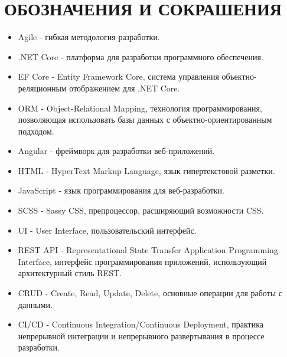 \section*{ОБОЗНАЧЕНИЯ И СОКРАШЕНИЯ}

\begin{itemize}
    \item Agile -\- гибкая методология разработки.
    \item .NET Core -\- платформа для разработки программного обеспечения.
    \item EF Core -\- Entity Framework Core, система управления объектно-реляционным отображением для .NET Core.
    \item ORM -\- Object-Relational Mapping, технология программирования, позволяющая использовать базы данных с объектно-ориентированным подходом.
    \item Angular -\- фреймворк для разработки веб-приложений.
    \item HTML -\- HyperText Markup Language, язык гипертекстовой разметки.
    \item JavaScript -\- язык программирования для веб-разработки.
    \item SCSS -\- Sassy CSS, препроцессор, расширяющий возможности CSS.
    \item UI -\- User Interface, пользовательский интерфейс.
    \item REST API -\- Representational State Transfer Application Programming Interface, интерфейс программирования приложений, использующий архитектурный стиль REST.
    \item CRUD -\- Create, Read, Update, Delete, основные операции для работы с данными.
    \item CI/CD -\- Continuous Integration/Continuous Deployment, практика непрерывной интеграции и непрерывного развертывания в процессе разработки.
\end{itemize}
